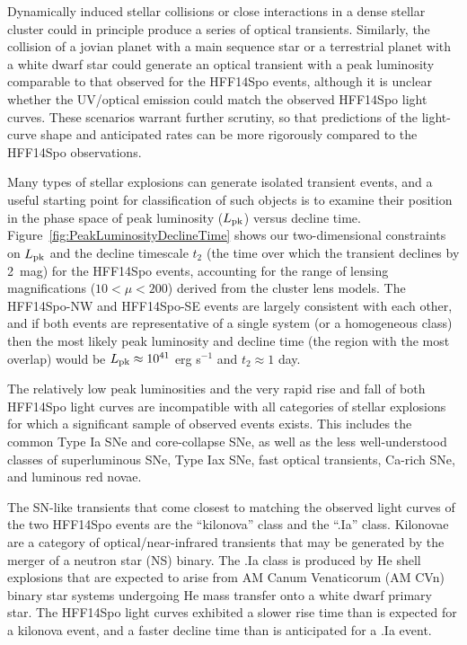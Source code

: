 \documentclass{article}
\providecommand\citep{\cite}
\def\spock{HFF14Spo\xspace}
\def\spockone{HFF14Spo-NW\xspace}
\def\spocktwo{HFF14Spo-SE\xspace}
\def\Lpk{\ensuremath{L_{\rm pk}}\xspace}
\def\t2{\ensuremath{t_{2}}\xspace}
\begin{document}
Dynamically induced stellar collisions or close interactions in a
dense stellar cluster\citep{Fregeau:2004} could in principle produce a
series of optical transients. Similarly, the collision of a jovian
planet with a main sequence star\cite{Metzger:2012,Yamazaki:2017} or a
terrestrial planet with a white dwarf star\cite{Di-Stefano:2015} could
generate an optical transient with a peak luminosity comparable to
that observed for the \spock events, although it is unclear whether
the UV/optical emission could match the observed \spock light curves.
These scenarios warrant further scrutiny, so that predictions of the
light-curve shape and anticipated rates can be more rigorously
compared to the \spock observations.

Many types of stellar explosions can generate isolated transient
events, and a useful starting point for classification of such objects
is to examine their position in the phase space of peak luminosity
(\Lpk) versus decline time\cite{Kulkarni:2007}.
Figure~\ref{fig:PeakLuminosityDeclineTime} shows our two-dimensional
constraints on \Lpk and the decline timescale \t2 (the time over which
the transient declines by 2~mag) for the \spock events,
accounting for the range of lensing magnifications ($10<\mu<200$)
derived from the cluster lens models.  The \spockone and \spocktwo
events are largely consistent with each other, and if both events are
representative of a single system (or a homogeneous class) then the
most likely peak luminosity and decline time (the region with the most
overlap) would be $L_{\rm pk}\approx10^{41}$ erg s$^{-1}$ and $t_2\approx1$
day.

The relatively low peak luminosities and the very rapid rise and fall
of both \spock light curves are incompatible with all categories of
stellar explosions for which a significant sample of observed events
exists.  This includes the common Type Ia SNe and core-collapse SNe,
as well as the less well-understood classes of superluminous
SNe\cite{Gal-Yam:2012}, Type Iax SNe\citep{Foley:2013a}, fast optical
transients\cite{Drout:2014}, Ca-rich SNe\cite{Kasliwal:2012}, and
luminous red novae\cite{Kulkarni:2007}.  

The SN-like transients that come closest to matching the observed
light curves of the two \spock events are the ``kilonova'' class and
the ``.Ia'' class.  Kilonovae are a category of optical/near-infrared
transients that may be generated by the merger of a neutron star (NS)
binary\cite{Li:1998, Tanvir:2013, Jin:2016}.  The .Ia class is
produced by He shell explosions that are expected to arise from AM
Canum Venaticorum (AM CVn) binary star systems undergoing He mass
transfer onto a white dwarf primary star\cite{Bildsten:2007}.  The
\spock light curves exhibited a slower rise time than is expected for
a kilonova event\cite{Barnes:2013, Kasen:2015}, and a faster decline
time than is anticipated for a .Ia event\cite{Shen:2010}.
\end{document}
